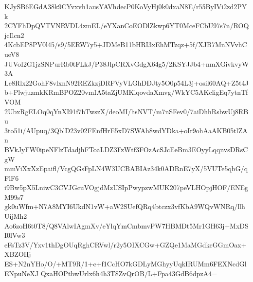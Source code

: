 KJySB6EGdA38k9CYvxvh1ausYAVhdecP0KoVyHj0k0dxaN8E/r55ByIVi2zd2PYk
2CYFhDpQVTVNRVDL4zmEL/eYXanCoEODlZkwp6YT0MceFCbU97s7n/ROQjcIlcn2
4KcbEP8PV0l45/s9/5ERW7y5+JDMeB11bHRI3xEhMTzqz+5f/XJB7MnNVvhCueV8
JUVoI2G1jzSNPurRb0tFLkJ/P38JlpCRXvGdgX64g5/2KSYJJb4+nmXGivkvyW3A
Le8Rlx22GohF8vlxnN92REZkzjDRFVyVLGhDDJty5O0p54L3j+osil60AQ+Z5t4J
b+PlwjuzmkKRmBPOZ20vmIA5taZjUMKlqovdaXmvg/WkYC5AKcligEq7ytnTfVOM
2UbxRgELOq0qYnXI91f7bTwszX/deoMI/hsNVT/m7nSFev0/7aiDhhRsbwUj8RBu
3to51i/AUpuq/3QblD23v02FEnfHrE5xD7SWAh8wdYDka+oIr9ohAaAKB05tlZAn
BVkJyFW0ipeNFlzTdadjhFToaLDZ3FzWtf3FOzAcSJcEeBm3EOyyLqqnvsDRsCgW
mmViXxXzEpaifl/VcgQGsFpLN4W3UCBABIAz34k0ADRnE7yX/5VUTe5qbG/qFlF6
i9Bw5pX5LniwC3CVJGcuVOgjdMzUSIpPwypzwMUK207peVLHOpjHOF/ENEgM99s7
gk0uWfm+N7A8MYI6UkdN1vW+aW2SUefQRq4btczx3vfKbA9WQvWNRq/llhUijMh2
Ao6zoH6t0T8/Q8VAlwIAgmXv/eYlqYmCmbmvPW7HBMDt5Mr1GH63j+MxDSI0lVw3
eFsTz3V/Yxv1thDgOUqRghCRVwl/r2y5OIXCGw+GZQe1MaMGdkcGGmOax+XBZOHj
ES+N2nYHo/O/+MT9R/1+c+f1CcHO7kGDLyMGhyyUqkIRUMm6FEXNcdGlENpuNeXJ
QxaHOPtbwUrlx6h4h3T8ZvQrOB/L+Fpa43GdB6dpzA4=
